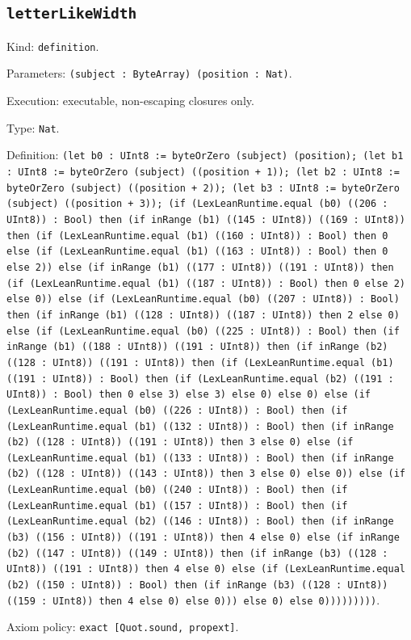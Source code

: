 \documentclass[11pt]{article}
\begin{document}
\subsection*{\texttt{letterLikeWidth}}
\noindent Kind: \texttt{definition}.\par
\noindent Parameters: \texttt{(subject : ByteArray) (position : Nat)}.\par
\noindent Execution: executable, non-escaping closures only.\par
\noindent Type: \texttt{Nat}.\par
\noindent Definition: \texttt{(let b0 : UInt8 := byteOrZero (subject) (position); (let b1 : UInt8 := byteOrZero (subject) ((position + 1)); (let b2 : UInt8 := byteOrZero (subject) ((position + 2)); (let b3 : UInt8 := byteOrZero (subject) ((position + 3)); (if (LexLeanRuntime.equal (b0) ((206 : UInt8)) : Bool) then (if inRange (b1) ((145 : UInt8)) ((169 : UInt8)) then (if (LexLeanRuntime.equal (b1) ((160 : UInt8)) : Bool) then 0 else (if (LexLeanRuntime.equal (b1) ((163 : UInt8)) : Bool) then 0 else 2)) else (if inRange (b1) ((177 : UInt8)) ((191 : UInt8)) then (if (LexLeanRuntime.equal (b1) ((187 : UInt8)) : Bool) then 0 else 2) else 0)) else (if (LexLeanRuntime.equal (b0) ((207 : UInt8)) : Bool) then (if inRange (b1) ((128 : UInt8)) ((187 : UInt8)) then 2 else 0) else (if (LexLeanRuntime.equal (b0) ((225 : UInt8)) : Bool) then (if inRange (b1) ((188 : UInt8)) ((191 : UInt8)) then (if inRange (b2) ((128 : UInt8)) ((191 : UInt8)) then (if (LexLeanRuntime.equal (b1) ((191 : UInt8)) : Bool) then (if (LexLeanRuntime.equal (b2) ((191 : UInt8)) : Bool) then 0 else 3) else 3) else 0) else 0) else (if (LexLeanRuntime.equal (b0) ((226 : UInt8)) : Bool) then (if (LexLeanRuntime.equal (b1) ((132 : UInt8)) : Bool) then (if inRange (b2) ((128 : UInt8)) ((191 : UInt8)) then 3 else 0) else (if (LexLeanRuntime.equal (b1) ((133 : UInt8)) : Bool) then (if inRange (b2) ((128 : UInt8)) ((143 : UInt8)) then 3 else 0) else 0)) else (if (LexLeanRuntime.equal (b0) ((240 : UInt8)) : Bool) then (if (LexLeanRuntime.equal (b1) ((157 : UInt8)) : Bool) then (if (LexLeanRuntime.equal (b2) ((146 : UInt8)) : Bool) then (if inRange (b3) ((156 : UInt8)) ((191 : UInt8)) then 4 else 0) else (if inRange (b2) ((147 : UInt8)) ((149 : UInt8)) then (if inRange (b3) ((128 : UInt8)) ((191 : UInt8)) then 4 else 0) else (if (LexLeanRuntime.equal (b2) ((150 : UInt8)) : Bool) then (if inRange (b3) ((128 : UInt8)) ((159 : UInt8)) then 4 else 0) else 0))) else 0) else 0)))))))))}.\par
\noindent Axiom policy: \texttt{exact [Quot.sound, propext]}.\par
\end{document}
